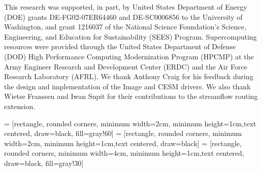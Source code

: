 \documentclass[gmd, manuscript]{copernicus}
\begin{document}
\begin{acknowledgements}
  This research was supported, in part, by United States Department of Energy (DOE) grants DE-FG02-07ER64460 and DE-SC0006856 to the University of Washington, and grant 1216037 of the National Science Foundation's Science, Engineering, and Education for Sustainability (SEES) Program. Supercomputing resources were provided through the United States Department of Defense (DOD) High Performance Computing Modernization Program (HPCMP) at the Army Engineer Research and Development Center (ERDC) and the Air Force Research Laboratory (AFRL).  We thank Anthony Craig for his feedback during the design and implementation of the Image and CESM drivers. We also thank Wietse Franssen and Iwan Supit for their contributions to the streamflow routing extension.
\end{acknowledgements}




%
%
%










\clearpage
{} = [rectangle, rounded corners, minimum width=2cm, minimum height=1cm,text centered, draw=black, fill=gray!60]
 = [rectangle, rounded corners, minimum width=2cm, minimum height=1cm,text centered, draw=black]
 = [rectangle, rounded corners, minimum width=4cm, minimum height=1cm,text centered, draw=black, fill=gray!30]
\end{document}
